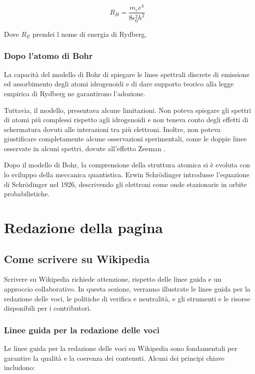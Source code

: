 \documentclass[12pt,a4paper]{report}
\begin{document}
\[ R_H = \frac{m_e e^4}{8 \epsilon_0^2 h^2} \]

Dove \(R_E\) prendei l nome di energia di Rydberg,

\subsection{Dopo l'atomo di Bohr}

La capacità del modello di Bohr di spiegare le linee spettrali discrete di emissione ed assorbimento degli atomi idrogenoidi e di dare supporto teorico alla legge empirica di Rydberg ne garantirono l'adozione.

Tuttavia, il modello, presentava alcune limitazioni. Non poteva spiegare gli spettri di atomi più complessi rispetto agli idrogenoidi e non teneva conto degli effetti di schermatura dovuti alle interazioni tra più elettroni. Inoltre, non poteva giustificare completamente alcune osservazioni sperimentali, come le doppie linee osservate in alcuni spettri, dovute all'effetto Zeeman \cite{ZeemanEffect}.

Dopo il modello di Bohr, la comprensione della struttura atomica si è evoluta con lo sviluppo della meccanica quantistica. Erwin Schrödinger introdusse l'equazione di Schrödinger nel 1926, descrivendo gli elettroni come onde stazionarie in orbite probabilistiche.

\chapter{Redazione della pagina}
\section{Come scrivere su Wikipedia}

Scrivere su Wikipedia richiede attenzione, rispetto delle linee guida e un approccio collaborativo. In questa sezione, verranno illustrate le linee guida per la redazione delle voci, le politiche di verifica e neutralità, e gli strumenti e le risorse disponibili per i contributori.

\subsection{Linee guida per la redazione delle voci}

Le linee guida per la redazione delle voci su Wikipedia sono fondamentali per garantire la qualità e la coerenza dei contenuti. Alcuni dei principi chiave includono:
\end{document}

